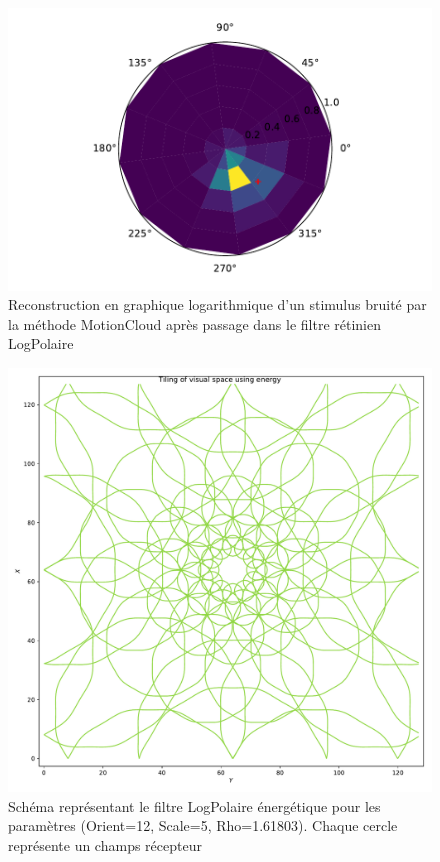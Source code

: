 \begin{figure}[th]
\centering
\includegraphics[scale=0.4]{Figures/mnist_log_motioncloud}
\decoRule
\caption[Figure]{Reconstruction en graphique logarithmique d'un stimulus bruité par la méthode MotionCloud après passage dans le filtre rétinien LogPolaire}
\label{fig:mnist_log_motioncloud}
\end{figure}

\begin{figure}[th]
\centering
\includegraphics[scale=0.4]{Figures/logpol_energy_filter}
\decoRule
\caption[Figure]{Schéma représentant le filtre LogPolaire énergétique pour les paramètres (Orient=12, Scale=5, Rho=1.61803). Chaque cercle représente un champs récepteur}
\label{fig:energy_filter}
\end{figure}

